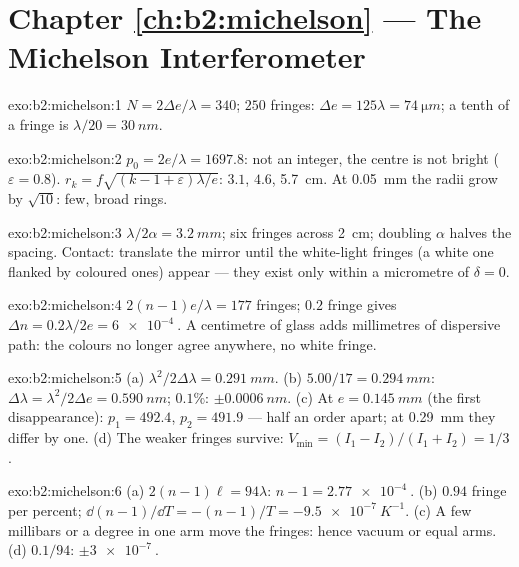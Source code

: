 \section*{Chapter \ref{ch:b2:michelson} --- The Michelson Interferometer}

\begin{solution}{exo:b2:michelson:1}
$N = 2\Delta e/\lambda = 340$; $250$ fringes: $\Delta e = 125\lambda = \qty{74}{\micro m}$; a tenth of a
fringe is $\lambda/20 = \qty{30}{nm}$.
\end{solution}

\begin{solution}{exo:b2:michelson:2}
$p_0 = 2e/\lambda = 1697.8$: not an integer, the centre is not bright ($\varepsilon =
0.8$). $r_k = f\sqrt{(k - 1 + \varepsilon)\lambda/e}$: $3.1$, $4.6$, \qty{5.7}{cm}. At \qty{0.05}{mm} the
radii grow by $\sqrt{10}$: few, broad rings.
\end{solution}

\begin{solution}{exo:b2:michelson:3}
$\lambda/2\alpha = \qty{3.2}{mm}$; six fringes across \qty{2}{cm}; doubling $\alpha$ halves the
spacing. Contact: translate the mirror until the white-light fringes
(a white one flanked by coloured ones) appear --- they exist only within
a micrometre of $\delta = 0$.
\end{solution}

\begin{solution}{exo:b2:michelson:4}
$2(n - 1)e/\lambda = 177$ fringes; $0.2$ fringe gives $\Delta n = 0.2\lambda/2e = \qty{6e-4}{}$.
A centimetre of glass adds millimetres of dispersive path: the colours
no longer agree anywhere, no white fringe.
\end{solution}

\begin{solution}{exo:b2:michelson:5}
(a) $\lambda^2/2\Delta\lambda = \qty{0.291}{mm}$. (b) $5.00/17 = \qty{0.294}{mm}$: $\Delta\lambda = \lambda^2/2\Delta e =
\qty{0.590}{nm}$; $0.1\%$: $\pm\qty{0.0006}{nm}$. (c) At $e = \qty{0.145}{mm}$ (the first
disappearance): $p_1 = 492.4$, $p_2 = 491.9$ --- half an order apart; at
\qty{0.29}{mm} they differ by one. (d) The weaker fringes survive: $V_{\min} =
(I_1 - I_2)/(I_1 + I_2) = 1/3$.
\end{solution}

\begin{solution}{exo:b2:michelson:6}
(a) $2(n - 1)\ell = 94\lambda$: $n - 1 = \qty{2.77e-4}{}$. (b) $0.94$ fringe per percent;
$\dd(n - 1)/\dd T = -(n - 1)/T = \qty{-9.5e-7}{K^{-1}}$. (c) A few millibars or a
degree in one arm move the fringes: hence vacuum or equal arms. (d)
$0.1/94$: $\pm\qty{3e-7}{}$.
\end{solution}

